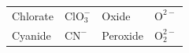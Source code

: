 {\begin{center}
\begin{xtabular*}{\mytablewidth}[t]{|p{10\mystarwidth}|p{10\mystarwidth}|p{10\mystarwidth}|p{10\mystarwidth}|}
    
        Chlorate &
    
    
        \begin{math}\mathrm{ClO}_{3}^{-}\end{math} &
    
    
        Oxide &
    
    
        \begin{math}{\mathrm{O}}^{2-}\end{math}%
     \tabularnewline{}
    
    
        Cyanide &
    
    
        \begin{math}{\mathrm{CN}}^{-}\end{math} &
    
    
        Peroxide &
    
    
        \begin{math}\mathrm{O}_{2}^{2-}\end{math}%
     \tabularnewline{}
    

\end{xtabular*}
\end{center}}
